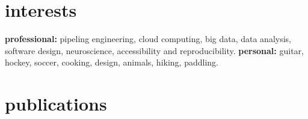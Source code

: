 \documentclass[]{friggeri-cv} %
\begin{document}

\section{interests}

\textbf{professional:} pipeling engineering, cloud computing, big data, data analysis, software design, neuroscience, accessibility and reproducibility. \textbf{personal:} guitar, hockey, soccer, cooking, design, animals, hiking, paddling.


\section{publications}

\newpage
{} %





\end{document}
